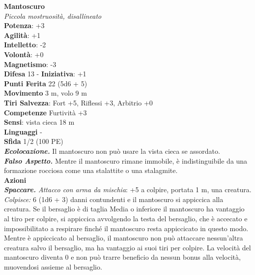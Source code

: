 \begin{multicols}{2}
\medskip\textbf{Mantoscuro}\\
\emph{Piccola mostruosità, disallineato}\\
\textbf{Potenza}: +3\\
\textbf{Agilità}: +1\\
\textbf{Intelletto}: -2\\
\textbf{Volontà}: +0\\
\textbf{Magnetismo}: -3\\
\textbf{Difesa} 13 - \textbf{Iniziativa}: +1\\
\textbf{Punti Ferita} 22 (5d6 + 5)\\
\textbf{Movimento} 3 m, volo 9 m\\
\textbf{Tiri Salvezza}: Fort +5, Riflessi +3, Arbitrio +0\\
\textbf{Competenze} Furtività +3\\
\textbf{Sensi}: vista cieca 18 m\\
\textbf{Linguaggi} -\\
\textbf{Sfida} 1/2 (100 PE)\smallskip\\
\emph{\textbf{Ecolocazione.}} Il mantoscuro non può usare la vista cieca se assordato.\\
\emph{\textbf{Falso Aspetto.}} Mentre il mantoscuro rimane immobile, è indistinguibile da una formazione rocciosa come una stalattite o una stalagmite.\\
\smallskip\textbf{Azioni}\\
\emph{\textbf{Spaccare.} Attacco con arma da mischia}: +5 a colpire, portata 1 m, una creatura.\\
\emph{Colpisce:} 6 (1d6 + 3) danni contundenti e il mantoscuro si appiccica alla creatura. Se il bersaglio è di taglia Media o inferiore il mantoscuro ha vantaggio al tiro per colpire, si appiccica avvolgendo la testa del bersaglio, che è accecato e impossibilitato a respirare finché il mantoscuro resta appiccicato in questo modo. \\
Mentre è appiccicato al bersaglio, il mantoscuro non può attaccare nessun'altra creatura salvo il bersaglio, ma ha vantaggio ai suoi tiri per colpire. La velocità del mantoscuro diventa 0 e non può trarre beneficio da nessun bonus alla velocità, muovendosi assieme al bersaglio.\\


\end{multicols}
